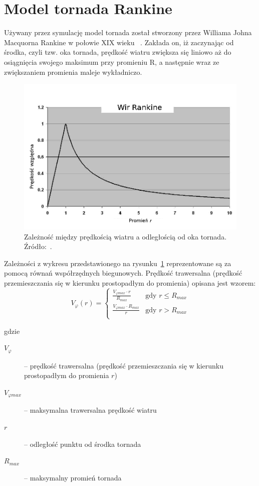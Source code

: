 \section{Model tornada Rankine}

Używany przez symulację model tornada został stworzony przez Williama Johna Macquorna Rankine  w połowie XIX wieku ~\cite{dbg_vortex}. Zakłada on, iż zaczynając od środka, czyli tzw. oka tornada, prędkość wiatru zwiększa się liniowo aż do osiągnięcia swojego maksimum przy promieniu R, a następnie wraz ze zwiększaniem promienia maleje wykładniczo. 

\begin{figure}[!h]
	\center
	\includegraphics[scale=0.45]{rankine1}
	\caption{Zależność między prędkością wiatru a odległością od oka tornada. Źródło:~\cite{ktk_vortex}.}
	\label{fig:rankine1}
\end{figure} 

Zależności z wykresu przedstawionego na rysunku~\ref{fig:rankine1} reprezentowane są za pomocą równań współrzędnych biegunowych. Prędkość trawersalna (prędkość przemieszczania się w kierunku prostopadłym do promienia) opisana jest wzorem:
$$ V_{\varphi}(r) =  \left\{ \begin{array}{ll}
\frac{V_{\varphi  max}\cdot r}{R_{max}} & \textrm{gdy $r \leq R_{max}$}\\
\frac{V_{\varphi  max}\cdot R_{max}}{r} & \textrm{gdy $r > R_{max}$}\\
\end{array} \right.$$

gdzie

\begin{description}
  \item[$V_{\varphi}$] --  prędkość trawersalna (prędkość przemieszczania się w kierunku prostopadłym do promienia $r$)
  \item[${V_{\varphi  max}}$ ]-- maksymalna trawersalna prędkość wiatru
  \item[$r$ ]-- odległość punktu od środka tornada
  \item[$R_{max}$]-- maksymalny promień tornada
\end{description}

